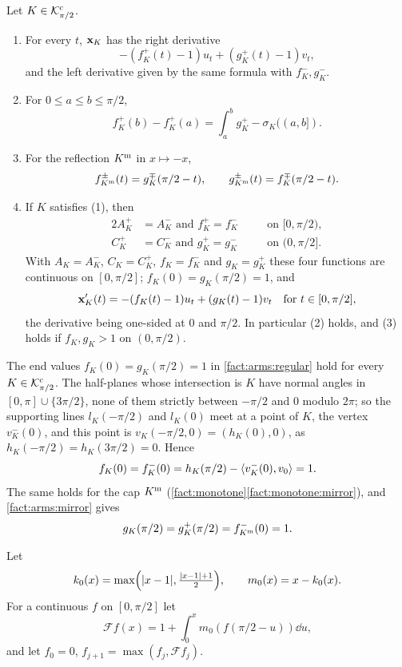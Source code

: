 \begin{fact}[arms]\label{fact:arms}
Let $K\in\mathcal{K}^{\mathrm{c}}_{\pi/2}$.
\begin{enumerate}[label=(\alph*)]
\item\label{fact:arms:deriv} For every $t$, $\mathbf{x}_K$ has the right derivative
\[
  -(f_K^+(t)-1)u_t+(g_K^+(t)-1)v_t,
\]
and the left derivative given by the same formula with $f^-_K,g^-_K$.
\item\label{fact:arms:integral} For $0\le a\le b\le\pi/2$,
\[
  f_K^+(b)-f_K^+(a)=\int_a^bg_K^+-\sigma_K((a,b]).
\]
\item\label{fact:arms:mirror} For the reflection $K^{\mathrm{m}}$ in $x\mapsto-x$,
\[
  f_{K^{\mathrm{m}}}^\pm(t)=g_K^\mp(\pi/2-t),\qquad
  g_{K^{\mathrm{m}}}^\pm(t)=f_K^\mp(\pi/2-t).
\]
\item\label{fact:arms:regular} If $K$ satisfies (1), then
\begin{alignat*}{2}
  A_K^+&=A_K^-\text{ and }f_K^+=f_K^-&\quad&\text{on }[0,\pi/2),\\
  C_K^+&=C_K^-\text{ and }g_K^+=g_K^-&&\text{on }(0,\pi/2].
\end{alignat*}
With $A_K=A_K^-$, $C_K=C_K^+$, $f_K=f_K^-$ and $g_K=g_K^+$ these four functions
are continuous on $[0,\pi/2]$; $f_K(0)=g_K(\pi/2)=1$, and
\[
  \mathbf{x}_K'(t)=-(f_K(t)-1)u_t+(g_K(t)-1)v_t\quad\text{for }t\in[0,\pi/2],
\]
the derivative being one-sided at $0$ and $\pi/2$. In particular (2) holds, and
(3) holds if $f_K,g_K>1$ on $(0,\pi/2)$. 
\end{enumerate}
\end{fact}

The end values $f_K(0)=g_K(\pi/2)=1$ in \ref{fact:arms:regular} hold for every
$K\in\mathcal{K}^{\mathrm{c}}_{\pi/2}$. The half-planes whose intersection is $K$ have normal angles
in $[0,\pi]\cup\{3\pi/2\}$, none of them strictly between $-\pi/2$ and $0$
modulo $2\pi$; so the supporting lines $l_K(-\pi/2)$ and $l_K(0)$ meet at a
point of $K$, the vertex $v_K^-(0)$, and this point is
$v_K(-\pi/2,0)=(h_K(0),0)$, as $h_K(-\pi/2)=h_K(3\pi/2)=0$. Hence
\[
  f_K(0)=f_K^-(0)=h_K(\pi/2)-\langle v_K^-(0),v_0\rangle=1.
\]
The same holds for the cap $K^{\mathrm{m}}$
(\cref{fact:monotone}\ref{fact:monotone:mirror}), and \ref{fact:arms:mirror}
gives
\[
  g_K(\pi/2)=g_K^+(\pi/2)=f^-_{K^{\mathrm{m}}}(0)=1.
\]

\begin{definition}\label{def:iteration}
Let
\[
  k_0(x)=\max\Bigl(\lvert x-1\rvert,\tfrac{\lvert x-1\rvert+1}2\Bigr),\qquad m_0(x)=x-k_0(x) .
\]
For a continuous $f$ on $[0,\pi/2]$ let
\[
  \mathcal Ff(x)=1+\int_0^xm_0(f(\pi/2-u))\dd u,
\]
and let $f_0=0$, $f_{j+1}=\max(f_j,\mathcal Ff_j)$.
\end{definition}

